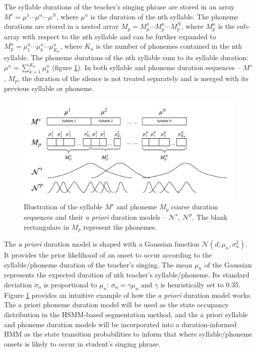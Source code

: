 The syllable durations of the teacher's singing phrase are stored in an array $M^s=\mu^{1} \cdots \mu^{n} \cdots \mu^{N}$, where $\mu^{n}$ is the duration of the nth syllable. The phoneme durations are stored in a nested array $M_p=M^{1}_p \cdots M^{n}_p \cdots M^{N}_p$, where $M^{n}_p$ is the sub-array with respect to the nth syllable and can be further expanded to $M^{n}_p=\mu_{1}^{n} \cdots \mu_{k}^{n} \cdots \mu_{K_{n}}^{n}$, where $K_{n}$ is the number of phonemes contained in the nth syllable. The phoneme durations of the nth syllable sum to its syllable duration: $\mu^{n}=\sum_{k=1}^{K_{n}} \mu_k^{n}$ (figure \ref{fig:coarse_dur}). In both syllable and phoneme duration sequences -- $M^s$, $M_p$, the duration of the silence is not treated separately and is merged with its previous syllable or phoneme.

\begin{figure}[ht!]
    \centering
    \includegraphics[width=\textwidth]{figs/blockDiags_rong/ch5_coarse_durations_segmentation.png}
    \caption{Illustration of the syllable $M^s$ and phoneme $M_p$ coarse duration sequences and their \textit{a priori} duration models -- $\mathcal{N}^s$, $\mathcal{N}^p$. The blank rectangulars in $M_p$ represent the phonemes.}
    \label{fig:coarse_dur}
\end{figure}

The \textit{a priori} duration model is shaped with a Gaussian function $\mathcal{N} (d; {\mu}_n, \sigma_n^2)$. It provides the prior likelihood of an onset to occur according to the syllable/phoneme duration of the teacher's singing. The mean ${\mu}_n$ of the Gaussian represents the expected duration of nth teacher's syllable/phoneme. Its standard deviation $\sigma_n$ is proportional to $\mu_n$: $\sigma_n=\gamma \mu_n$ and $\gamma$ is heuristically set to 0.35. Figure \ref{fig:coarse_dur} provides an intuitive example of how the \textit{a priori} duration model works. The a priori phoneme duration model will be used as the state occupancy distribution in the HSMM-based segmentation method, and the a priori syllable and phoneme duration models will be incorporated into a duration-informed HMM as the state transition probabilities to inform that where syllable/phoneme onsets is likely to occur in student's singing phrase.

